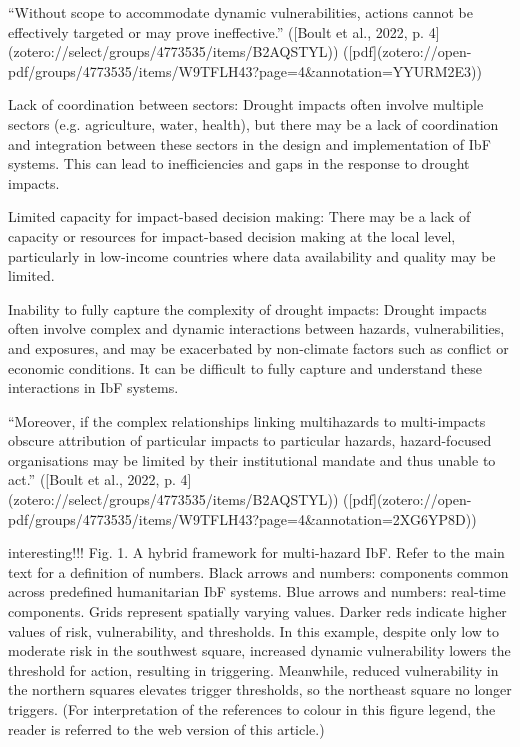{“Without scope to accommodate dynamic vulnerabilities, actions cannot be effectively targeted or may prove ineffective.” ([Boult et al., 2022, p. 4](zotero://select/groups/4773535/items/B2AQSTYL)) ([pdf](zotero://open-pdf/groups/4773535/items/W9TFLH43?page=4&annotation=YYURM2E3))

Lack of coordination between sectors: Drought impacts often involve multiple sectors (e.g. agriculture, water, health), but there may be a lack of coordination and integration between these sectors in the design and implementation of IbF systems. This can lead to inefficiencies and gaps in the response to drought impacts.

Limited capacity for impact-based decision making: There may be a lack of capacity or resources for impact-based decision making at the local level, particularly in low-income countries where data availability and quality may be limited.

Inability to fully capture the complexity of drought impacts: Drought impacts often involve complex and dynamic interactions between hazards, vulnerabilities, and exposures, and may be exacerbated by non-climate factors such as conflict or economic conditions. It can be difficult to fully capture and understand these interactions in IbF systems.

“Moreover, if the complex relationships linking multihazards to multi-impacts obscure attribution of particular impacts to particular hazards, hazard-focused organisations may be limited by their institutional mandate and thus unable to act.” ([Boult et al., 2022, p. 4](zotero://select/groups/4773535/items/B2AQSTYL)) ([pdf](zotero://open-pdf/groups/4773535/items/W9TFLH43?page=4&annotation=2XG6YP8D))

interesting!!! Fig. 1. A hybrid framework for multi-hazard IbF. Refer to the main text for a definition of numbers. Black arrows and numbers: components common across predefined humanitarian IbF systems. Blue arrows and numbers: real-time components. Grids represent spatially varying values. Darker reds indicate higher values of risk, vulnerability, and thresholds. In this example, despite only low to moderate risk in the southwest square, increased dynamic vulnerability lowers the threshold for action, resulting in triggering. Meanwhile, reduced vulnerability in the northern squares elevates trigger thresholds, so the northeast square no longer triggers. (For interpretation of the references to colour in this figure legend, the reader is referred to the web version of this article.)

}
